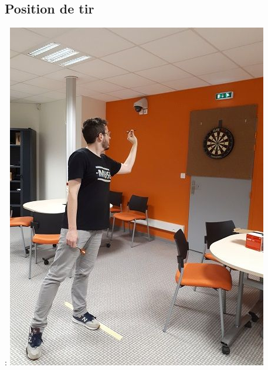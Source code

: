 \documentclass[svgnames]{beamer}
\begin{document}
	\subsection{Position de tir}
	\begin{frame}{\secname : \subsecname}
		\centering
		\includegraphics[scale=0.3]{img/darts_position_alt.jpg}
	\end{frame}
\end{document}
